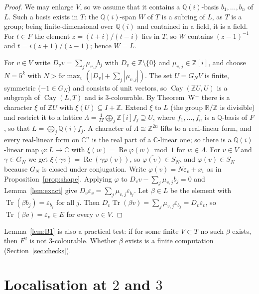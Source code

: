 \documentclass[11pt,a4paper]{amsart}
\theoremstyle{remark}
\newcommand{\Q}{\mathbb{Q}}
\newcommand{\R}{\mathbb{R}}
\newcommand{\Z}{\mathbb{Z}}
\newcommand{\C}{\mathbb{C}}
\newcommand{\Cay}{\operatorname{Cay}}
\newcommand{\Tr}{\operatorname{Tr}}
\begin{document}
\begin{proof}
We may enlarge $V$, so we assume that it contains a $\Q(i)$-basis $b_1,\dots,b_n$ of $L$. Such a basis exists in
$T$: the $\Q(i)$-span $W$ of $T$ is a subring of $L$, as $T$ is a group; being finite-dimensional over $\Q(i)$ and
contained in a field, it is a field. For $t\in F$ the element $z=(t+i)/(t-i)$ lies in $T$, so $W$ contains
$(z-1)^{-1}$ and $t=i(z+1)/(z-1)$; hence $W=L$.

For $v\in V$ write $D_vv=\sum_j\mu_{v,j}b_j$ with $D_v\in\Z\setminus\{0\}$ and $\mu_{v,j}\in\Z[i]$, and choose
$N=5^k$ with $N>6r\max_v(|D_v|+\sum_j|\mu_{v,j}|)$. The set $U=G_NV$ is finite, symmetric ($-1\in G_N$) and
consists of unit vectors, so $\Cay(\Z U,U)$ is a subgraph of $\Cay(L,T)$ and is $3$-colourable. By
Theorem~W$^+$ there is a character $\xi$ of $\Z U$ with $\xi(U)\subseteq I+\Z$. Extend $\xi$ to $L$ (the group
$\R/\Z$ is divisible) and restrict it to a lattice $\Lambda=\frac1M\bigoplus_j\Z[i]f_j\supseteq U$, where
$f_1,\dots,f_n$ is a $\Q$-basis of $F$, so that $L=\bigoplus_j\Q(i)f_j$. A character of $\Lambda\cong\Z^{2n}$ lifts
to a real-linear form, and every real-linear form on $\C^n$ is the real part of a $\C$-linear one; so there is a
$\Q(i)$-linear map $\varphi:L\to\C$ with $\xi(w)=\operatorname{Re}\varphi(w)\bmod1$ for $w\in\Lambda$. For $v\in V$
and $\gamma\in G_N$ we get $\xi(\gamma v)=\operatorname{Re}(\gamma\varphi(v))$, so $\overline{\varphi(v)}\in S_N$,
and $\varphi(v)\in S_N$ because $G_N$ is closed under conjugation. Write $\varphi(v)=N\varepsilon_v+x_v$ as in
Proposition~\ref{prop:shape}. Applying $\varphi$ to $D_vv-\sum_j\mu_{v,j}b_j=0$ and Lemma~\ref{lem:exact} give
$D_v\varepsilon_v=\sum_j\mu_{v,j}\varepsilon_{b_j}$. Let $\beta\in L$ be the element with
$\Tr(\beta b_j)=\varepsilon_{b_j}$ for all $j$. Then $D_v\Tr(\beta v)=\sum_j\mu_{v,j}\varepsilon_{b_j}=D_v\varepsilon_v$,
so $\Tr(\beta v)=\varepsilon_v\in E$ for every $v\in V$.
\end{proof}

Lemma~\ref{lem:B1} is also a practical test: if for some finite $V\subset T$ no such $\beta$ exists, then $F^2$ is
not $3$-colourable. Whether $\beta$ exists is a finite computation (Section~\ref{sec:checks}).

\section{Localisation at \texorpdfstring{$2$}{2} and \texorpdfstring{$3$}{3}}\label{sec:local}
\end{document}

